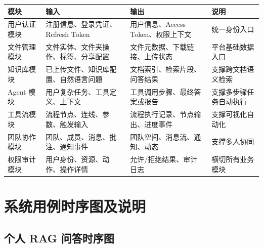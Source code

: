 \documentclass[a4paper,zihao=-4]{ctexart}
\begin{document}
\begin{longtable}{|>{\raggedright\arraybackslash}p{2.4cm}|>{\raggedright\arraybackslash}p{\dimexpr(\linewidth-2.4cm-8\tabcolsep-5\arrayrulewidth)/3\relax}|>{\raggedright\arraybackslash}p{\dimexpr(\linewidth-2.4cm-8\tabcolsep-5\arrayrulewidth)/3\relax}|>{\raggedright\arraybackslash}p{\dimexpr(\linewidth-2.4cm-8\tabcolsep-5\arrayrulewidth)/3\relax}|}
\hline
模块 & 输入 & 输出 & 说明\tabularnewline
\hline
\endhead
用户认证模块 & 注册信息、登录凭证、Refresh Token & 用户信息、Access Token、权限上下文 & 统一身份入口\tabularnewline
\hline
文件管理模块 & 文件实体、文件夹操作、标签、分享配置 & 文件元数据、下载链接、上传状态 & 平台基础数据入口\tabularnewline
\hline
知识库模块 & 已上传文件、知识库配置、自然语言问题 & 文档索引、检索片段、问答结果 & 支撑跨文档语义检索\tabularnewline
\hline
Agent 模块 & 用户复杂任务、工具定义、上下文 & 工具调用步骤、最终答案或报告 & 支撑多步骤任务自动执行\tabularnewline
\hline
工具流模块 & 流程节点、连线、参数、触发输入 & 流程执行记录、节点输出、进度事件 & 支撑可视化自动化\tabularnewline
\hline
团队协作模块 & 团队、成员、消息、批注、通知事件 & 团队空间、消息流、通知、动态 & 支撑多人协同\tabularnewline
\hline
权限审计模块 & 用户身份、资源、动作、操作详情 & 允许/拒绝结果、审计日志 & 横切所有业务模块\tabularnewline
\hline
\end{longtable}

\hypertarget{ux7cfbux7edfux7528ux4f8bux65f6ux5e8fux56feux53caux8bf4ux660e}{%
\section{系统用例时序图及说明}\label{ux7cfbux7edfux7528ux4f8bux65f6ux5e8fux56feux53caux8bf4ux660e}}

\hypertarget{ux4e2aux4eba-rag-ux95eeux7b54ux65f6ux5e8fux56fe}{%
\subsection{个人 RAG
问答时序图}\label{ux4e2aux4eba-rag-ux95eeux7b54ux65f6ux5e8fux56fe}}
\end{document}
